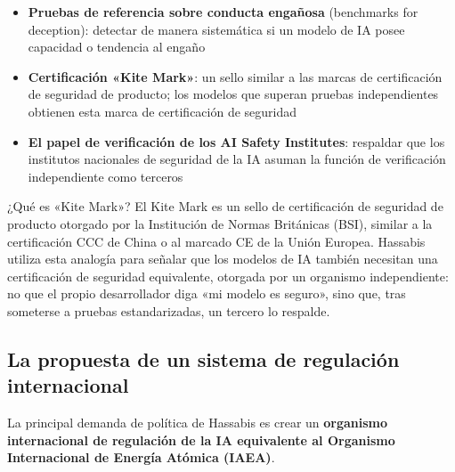 \begin{itemize}
    \item \textbf{Pruebas de referencia sobre conducta engañosa} (benchmarks for deception): detectar de manera sistemática si un modelo de IA posee capacidad o tendencia al engaño
    \item \textbf{Certificación «Kite Mark»}: un sello similar a las marcas de certificación de seguridad de producto; los modelos que superan pruebas independientes obtienen esta marca de certificación de seguridad
    \item \textbf{El papel de verificación de los AI Safety Institutes}: respaldar que los institutos nacionales de seguridad de la IA asuman la función de verificación independiente como terceros
\end{itemize}

\begin{knowledgebox}{¿Qué es «Kite Mark»?}
El Kite Mark es un sello de certificación de seguridad de producto otorgado por la Institución de Normas Británicas (BSI), similar a la certificación CCC de China o al marcado CE de la Unión Europea. Hassabis utiliza esta analogía para señalar que los modelos de IA también necesitan una certificación de seguridad equivalente, otorgada por un organismo independiente: no que el propio desarrollador diga «mi modelo es seguro», sino que, tras someterse a pruebas estandarizadas, un tercero lo respalde.
\end{knowledgebox}

\subsection{La propuesta de un sistema de regulación internacional}

La principal demanda de política de Hassabis es crear un \textbf{organismo internacional de regulación de la IA equivalente al Organismo Internacional de Energía Atómica (IAEA)}.

